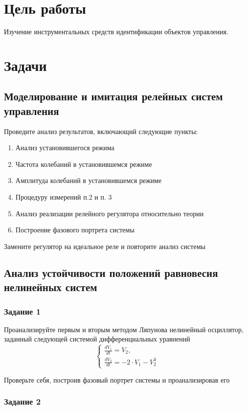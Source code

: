 \section{Цель работы}
Изучение инструментальных средств идентификации объектов управления.

\section{Задачи}
\subsection{Моделирование и имитация релейных систем управления}
Проведите анализ результатов, включающий следующие пункты:

\begin{enumerate}
	\item Анализ установившегося режима
	\item Частота колебаний в установившемся режиме
	\item Амплитуда колебаний в установившемся режиме
	\item Процедуру измерений п.2 и п. 3
	\item Анализ реализации релейного регулятора относительно теории
	\item Построение фазового портрета системы
\end{enumerate}

Замените регулятор на идеальное реле и повторите анализ системы

\subsection{Анализ устойчивости положений равновесия нелинейных систем}

\subsubsection{Задание 1}

Проанализируйте первым и вторым методом Ляпунова нелинейный осциллятор, заданный следующей системой дифференциальных уравнений
$$
\begin{cases}
	\frac{dV_1}{dt} = V_2, \\
	\frac{dV_2}{dt} = -2 \cdot V_1 -V_2^3
\end{cases}
$$

Проверьте себя, построив фазовый портрет системы и проанализировав его

\subsubsection{Задание 2}

